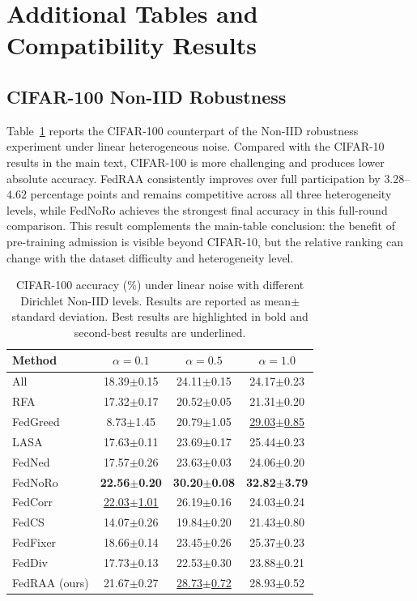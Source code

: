 \documentclass[conference]{IEEEtran}
\theoremstyle{definition}
\theoremstyle{remark}
\begin{document}
\section{Additional Tables and Compatibility Results}
\label{app:additional_results}

\subsection{CIFAR-100 Non-IID Robustness}

Table~\ref{tab:cifar100_noniid_appendix} reports the CIFAR-100 counterpart of the Non-IID robustness experiment under linear heterogeneous noise.
Compared with the CIFAR-10 results in the main text, CIFAR-100 is more challenging and produces lower absolute accuracy.
FedRAA consistently improves over full participation by $3.28$--$4.62$ percentage points and remains competitive across all three heterogeneity levels, while FedNoRo achieves the strongest final accuracy in this full-round comparison.
This result complements the main-table conclusion: the benefit of pre-training admission is visible beyond CIFAR-10, but the relative ranking can change with the dataset difficulty and heterogeneity level.

\begin{table}[t]
\centering
\caption{CIFAR-100 accuracy (\%) under linear noise with different Dirichlet Non-IID levels. Results are reported as mean$\pm$standard deviation. Best results are highlighted in bold and second-best results are underlined.}
\label{tab:cifar100_noniid_appendix}
\setlength{\tabcolsep}{4pt}
\renewcommand{\arraystretch}{1.12}
\begin{tabular}{lccc}
\toprule
\textbf{Method} & $\alpha=0.1$ & $\alpha=0.5$ & $\alpha=1.0$ \\
\midrule
All & 18.39$\pm$0.15 & 24.11$\pm$0.15 & 24.17$\pm$0.23 \\
RFA~\cite{pillutla2022robust} & 17.32$\pm$0.17 & 20.52$\pm$0.05 & 21.31$\pm$0.20 \\
FedGreed~\cite{kritharakis2025fedgreed} & 8.73$\pm$1.45 & 20.79$\pm$1.05 & \underline{29.03$\pm$0.85} \\
LASA~\cite{xu2025lasa} & 17.63$\pm$0.11 & 23.69$\pm$0.17 & 25.44$\pm$0.23 \\
FedNed~\cite{lu2024fedned} & 17.57$\pm$0.26 & 23.63$\pm$0.03 & 24.06$\pm$0.20 \\
FedNoRo~\cite{wu2023fednoro} & \textbf{22.56$\pm$0.20} & \textbf{30.20$\pm$0.08} & \textbf{32.82$\pm$3.79} \\
FedCorr~\cite{xu2022fedcorr} & \underline{22.03$\pm$1.01} & 26.19$\pm$0.16 & 24.03$\pm$0.24 \\
FedCS~\cite{hao2025fedcs} & 14.07$\pm$0.26 & 19.84$\pm$0.20 & 21.43$\pm$0.80 \\
FedFixer~\cite{ji2024fedfixer} & 18.66$\pm$0.14 & 23.45$\pm$0.26 & 25.37$\pm$0.23 \\
FedDiv~\cite{li2024feddiv} & 17.73$\pm$0.13 & 22.53$\pm$0.30 & 23.88$\pm$0.21 \\
\midrule
FedRAA (ours) & 21.67$\pm$0.27 & \underline{28.73$\pm$0.72} & 28.93$\pm$0.52 \\
\bottomrule
\end{tabular}
\end{table}
\end{document}
